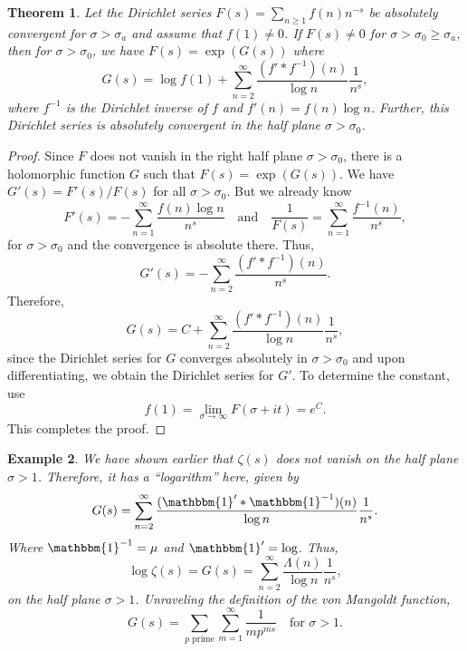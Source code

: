 \documentclass[12pt]{article}
\theoremstyle{thmstyle}
\newtheorem{theorem}{Theorem}[section]
\theoremstyle{defstyle}
\newtheorem{example}[theorem]{Example}
\renewcommand{\ge}{\geqslant}
\begin{document}
\begin{theorem}
    Let the Dirichlet series $F(s) = \sum_{n\ge 1} f(n)n^{-s}$ be absolutely convergent for $\sigma > \sigma_a$ and assume that $f(1)\ne 0$. If $F(s)\ne 0$ for $\sigma > \sigma_0\ge\sigma_a$, then for $\sigma > \sigma_0$, we have $F(s) = \exp(G(s))$ where 
    \begin{equation*}
        G(s) = \log f(1) + \sum_{n = 2}^\infty\frac{(f'\ast f^{-1})(n)}{\log n}\frac{1}{n^s},
    \end{equation*}
    where $f^{-1}$ is the Dirichlet inverse of $f$ and $f'(n) = f(n)\log n$. Further, this Dirichlet series is absolutely convergent in the half plane $\sigma > \sigma_0$.
\end{theorem}
\begin{proof}
    Since $F$ does not vanish in the right half plane $\sigma > \sigma_0$, there is a holomorphic function $G$ such that $F(s) = \exp(G(s))$. We have $G'(s) = F'(s)/F(s)$ for all $\sigma > \sigma_0$. But we already know 
    \begin{equation*}
        F'(s) = -\sum_{n = 1}^\infty\frac{f(n)\log n}{n^s}\quad\text{and}\quad\frac{1}{F(s)} = \sum_{n = 1}^\infty\frac{f^{-1}(n)}{n^s},
    \end{equation*}
    for $\sigma > \sigma_0$ and the convergence is absolute there. Thus, 
    \begin{equation*}
        G'(s) = - \sum_{n = 2}^\infty\frac{(f'\ast f^{-1})(n)}{n^s}.
    \end{equation*}
    Therefore, 
    \begin{equation*}
        G(s) = C + \sum_{n = 2}^\infty\frac{(f'\ast f^{-1})(n)}{\log n}\frac{1}{n^s},
    \end{equation*}
    since the Dirichlet series for $G$ converges absolutely in $\sigma > \sigma_0$ and upon differentiating, we obtain the Dirichlet series for $G'$. To determine the constant, use 
    \begin{equation*}
        f(1) = \lim_{\sigma\to\infty} F(\sigma + it) = e^C.
    \end{equation*}
    This completes the proof.
\end{proof}

\begin{example}
    We have shown earlier that $\zeta(s)$ does not vanish on the half plane $\sigma > 1$. Therefore, it has a ``logarithm'' here, given by 
    \begin{equation*}
        G(s) = \sum_{n = 2}^\infty\frac{(\mathbbm{1}'\ast \mathbbm{1}^{-1})(n)}{\log n}\frac{1}{n^s}.
    \end{equation*}
    Where $\mathbbm{1}^{-1} = \mu$ and $\mathbbm{1}' = \log$. Thus, 
    \begin{equation*}
        \log \zeta(s) = G(s) = \sum_{n = 2}^\infty\frac{\Lambda(n)}{\log n}\frac{1}{n^s},
    \end{equation*}
    on the half plane $\sigma > 1$. Unraveling the definition of the von Mangoldt function, 
    \begin{equation*}
        G(s) = \sum_{p\text{ prime}}\sum_{m = 1}^\infty\frac{1}{m p^{ms}}\quad\text{for }\sigma > 1.
    \end{equation*}
\end{example}
\end{document}
